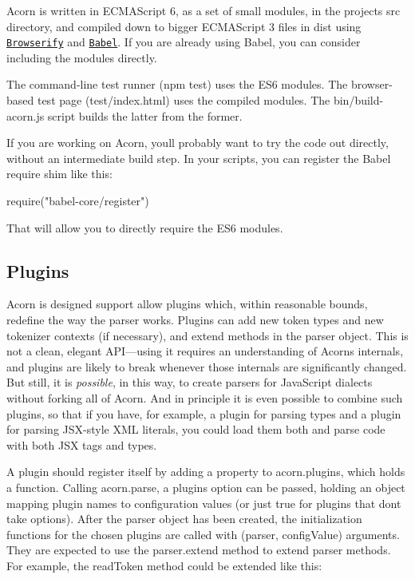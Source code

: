 Acorn is written in E\+C\+M\+A\+Script 6, as a set of small modules, in the project\textquotesingle{}s {\ttfamily src} directory, and compiled down to bigger E\+C\+M\+A\+Script 3 files in {\ttfamily dist} using \href{http://browserify.org}{\tt Browserify} and \href{http://babeljs.io/}{\tt Babel}. If you are already using Babel, you can consider including the modules directly.

The command-\/line test runner ({\ttfamily npm test}) uses the E\+S6 modules. The browser-\/based test page ({\ttfamily test/index.\+html}) uses the compiled modules. The {\ttfamily bin/build-\/acorn.\+js} script builds the latter from the former.

If you are working on Acorn, you\textquotesingle{}ll probably want to try the code out directly, without an intermediate build step. In your scripts, you can register the Babel require shim like this\+: \begin{DoxyVerb}require("babel-core/register")
\end{DoxyVerb}


That will allow you to directly {\ttfamily require} the E\+S6 modules.

\subsection*{Plugins}

Acorn is designed support allow plugins which, within reasonable bounds, redefine the way the parser works. Plugins can add new token types and new tokenizer contexts (if necessary), and extend methods in the parser object. This is not a clean, elegant A\+P\+I—using it requires an understanding of Acorn\textquotesingle{}s internals, and plugins are likely to break whenever those internals are significantly changed. But still, it is {\itshape possible}, in this way, to create parsers for Java\+Script dialects without forking all of Acorn. And in principle it is even possible to combine such plugins, so that if you have, for example, a plugin for parsing types and a plugin for parsing J\+S\+X-\/style X\+ML literals, you could load them both and parse code with both J\+SX tags and types.

A plugin should register itself by adding a property to {\ttfamily acorn.\+plugins}, which holds a function. Calling {\ttfamily acorn.\+parse}, a {\ttfamily plugins} option can be passed, holding an object mapping plugin names to configuration values (or just {\ttfamily true} for plugins that don\textquotesingle{}t take options). After the parser object has been created, the initialization functions for the chosen plugins are called with {\ttfamily (parser, config\+Value)} arguments. They are expected to use the {\ttfamily parser.\+extend} method to extend parser methods. For example, the {\ttfamily read\+Token} method could be extended like this\+:


